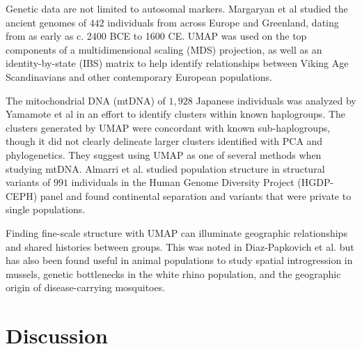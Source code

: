 \documentclass[12pt]{article}
\begin{document}
Genetic data are not limited to autosomal markers. Margaryan et al\cite{margaryan_population_2019} studied the ancient genomes of $442$ individuals from across Europe and Greenland, dating from as early as c. 2400 BCE to 1600 CE. UMAP was used on the top components of a multidimensional scaling (MDS) projection, as well as an identity-by-state (IBS) matrix to help identify relationships between Viking Age Scandinavians and other contemporary European populations. 

The mitochondrial DNA (mtDNA) of $1,928$ Japanese individuals was analyzed by Yamamote et al in an effort to identify clusters within known haplogroups\cite{yamamoto_genetic_2020}. The clusters generated by UMAP were concordant with known sub-haplogroups, though it did not clearly delineate larger clusters identified with PCA and phylogenetics. They suggest using UMAP as one of several methods when studying mtDNA. Almarri et al.\cite{almarri_population_2020} studied population structure in structural variants of $991$ individuals in the Human Genome Diversity Project (HGDP-CEPH) panel and found continental separation and variants that were private to single populations.

Finding fine-scale structure with UMAP can illuminate geographic relationships and shared histories between groups. This was noted in Diaz-Papkovich et al.\cite{diaz-papkovich_umap_2019} but has also been found useful in animal populations to study spatial introgression in mussels\cite{simon_local_2019}, genetic bottlenecks in the white rhino population\cite{sanchez-barreiro_historical_2020}, and the geographic origin of disease-carrying mosquitoes\cite{consortium_genome_2020}\cite{schmidt_population_2020}.

\section*{Discussion}
\end{document}
